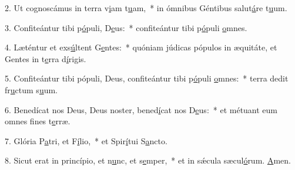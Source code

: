 2. Ut cognoscámus in terra v\uline{i}am t\uline{u}am,~* in ómnibus Géntibus salut\uline{á}re t\uline{u}um.\par 
3. Confiteántur tibi p\uline{ó}puli, D\uline{e}us:~* confiteántur tibi p\uline{ó}puli \uline{o}mnes.\par 
4. Læténtur et exs\uline{ú}ltent G\uline{e}ntes:~* quóniam júdicas pópulos in æquitáte, et Gentes in t\uline{e}rra d\uline{í}rigis.\par 
5. Confiteántur tibi pópuli, Deus, confiteántur tibi p\uline{ó}puli \uline{o}mnes:~* terra dedit fr\uline{u}ctum s\uline{u}um.\par 
6. Benedícat nos Deus, Deus noster, bened\uline{í}cat nos D\uline{e}us:~* et métuant eum omnes f\uline{i}nes t\uline{e}rræ.\par 
7. Glória P\uline{a}tri, et F\uline{í}lio,~* et Spir\uline{í}tui S\uline{a}ncto.\par 
8. Sicut erat in princípio, et n\uline{u}nc, et s\uline{e}mper,~* et in sǽcula sæcul\uline{ó}rum. \uline{A}men.\par 
